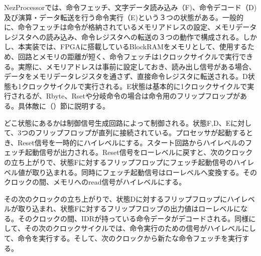 \documentclass[paper]{ieicej}
\begin{document}
NezProcessorでは、命令フェッチ、文字データ読み込み（F)、命令デコード（D)及び演算・データ転送を行う命令実行（E)という３つの状態がある。一般的に、命令フェッチは命令が格納されているメモリアドレスの設定、メモリデータレジスタへの読み込み、命令レジスタへの転送の３つの動作で構成される。しかし、本実装では、FPGAに搭載しているBlockRAMをメモリとして、使用するため、回路とメモリの距離が短く、命令フェッチは1クロックサイクルで実行できる。実際に、メモリアドレスは事前に設定しておき、読み出し信号がある場合、データをメモリデータレジスタを通さず、直接命令レジスタに転送される。D状態も1クロックサイクルで実行される。E状態は基本的に1クロックサイクルで実行されるが、Rbyte、Rsetや分岐命令の場合は命令用のフリップフロップがある。具体敵に（）節に説明する。

どこ状態にあるかは制御信号生成回路によって制御される。状態F,D、Eに対して、3つのフリップフロップが直列に接続されている。プロセッサが起動するとき、Reset信号を一時的にハイレベルにする。スタート回路からハイレベルのフェッチ起動信号が出力される。Reset信号をローレベルに戻すと、次のクロックの立ち上がりで、状態Fに対するフリップフロップにフェッチ起動信号のハイレベル値が取り込まれる。同時にフェッチ起動信号はローレベルへ変換する。そのクロックの間、メモリへのread信号がハイレベルにする。

その次のクロックの立ち上がりで、状態Dに対するフリップフロップにハイレベルが取り込まれ、状態Fに対するフリップフロップの出力値はローレベルになる。そのクロックの間、IDRが持っている命令データがデコードされる。同様にして、その次のクロックサイクルでは、命令実行のための信号がハイレベルにして、命令を実行する。そして、次のクロックから新たな命令フェッチを実行する。




\end{document}
